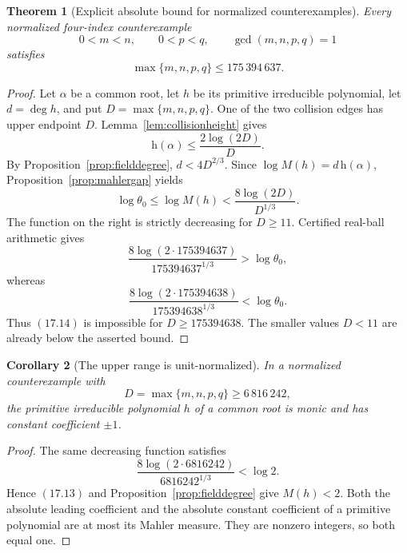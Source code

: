 \documentclass[11pt]{article}
\newtheorem{theorem}{Theorem}[section]
\newtheorem{corollary}[theorem]{Corollary}
\theoremstyle{definition}
\begin{document}
\begin{theorem}[Explicit absolute bound for normalized counterexamples]
\label{thm:explicitbound}
Every normalized four-index counterexample
\[
 0<m<n,\qquad0<p<q,\qquad\gcd(m,n,p,q)=1
\]
satisfies
\begin{equation}
 \boxed{\max\{m,n,p,q\}\leq175\,394\,637.}
 \tag{17.12}
\end{equation}
\end{theorem}

\begin{proof}
Let \(\alpha\) be a common root, let \(h\) be its primitive irreducible
polynomial, let \(d=\deg h\), and put
\(D=\max\{m,n,p,q\}\).  One of the two collision edges has upper endpoint
\(D\).  Lemma~\ref{lem:collisionheight} gives
\begin{equation}
 \mathrm h(\alpha)\leq\frac{2\log(2D)}D.
 \tag{17.13}
\end{equation}
By Proposition~\ref{prop:fielddegree},
\(d<4D^{2/3}\).  Since
\(\log M(h)=d\,\mathrm h(\alpha)\),
Proposition~\ref{prop:mahlergap} yields
\begin{equation}
 \log\theta_0
 \leq\log M(h)
 <\frac{8\log(2D)}{D^{1/3}}.
 \tag{17.14}
\end{equation}
The function on the right is strictly decreasing for \(D\geq11\).  Certified
real-ball arithmetic gives
\[
 \frac{8\log(2\cdot175394637)}{175394637^{1/3}}
   >\log\theta_0,
\]
whereas
\[
 \frac{8\log(2\cdot175394638)}{175394638^{1/3}}
   <\log\theta_0.
\]
Thus \((17.14)\) is impossible for \(D\geq175394638\).  The smaller values
\(D<11\) are already below the asserted bound.
\end{proof}

\begin{corollary}[The upper range is unit-normalized]\label{cor:unitrange}
In a normalized counterexample with
\[
 D=\max\{m,n,p,q\}\geq6\,816\,242,
\]
the primitive irreducible polynomial \(h\) of a common root is monic and has
constant coefficient \(\pm1\).
\end{corollary}

\begin{proof}
The same decreasing function satisfies
\[
 \frac{8\log(2\cdot6816242)}{6816242^{1/3}}<\log2.
\]
Hence \((17.13)\) and Proposition~\ref{prop:fielddegree} give
\(M(h)<2\).  Both the absolute leading coefficient and the absolute constant
coefficient of a primitive polynomial are at most its Mahler measure.  They
are nonzero integers, so both equal one.
\end{proof}
\end{document}
